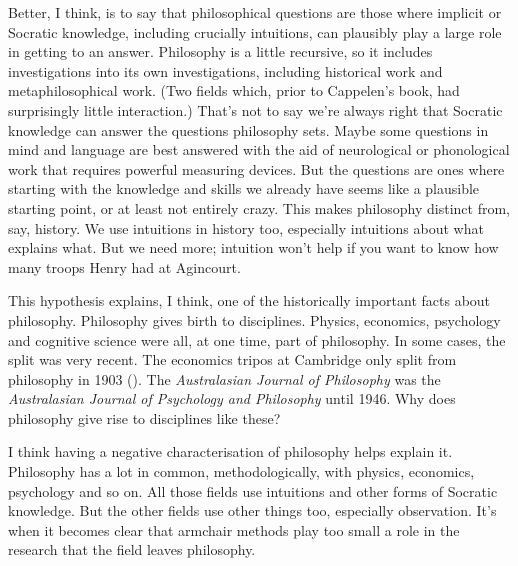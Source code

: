 \documentclass[
  10pt,
  letterpaper,
  DIV=11,
  numbers=noendperiod,
  twoside]{scrartcl}
\begin{document}
Better, I think, is to say that philosophical questions are those where
implicit or Socratic knowledge, including crucially intuitions, can
plausibly play a large role in getting to an answer. Philosophy is a
little recursive, so it includes investigations into its own
investigations, including historical work and metaphilosophical work.
(Two fields which, prior to Cappelen's book, had surprisingly little
interaction.) That's not to say we're always right that Socratic
knowledge can answer the questions philosophy sets. Maybe some questions
in mind and language are best answered with the aid of neurological or
phonological work that requires powerful measuring devices. But the
questions are ones where starting with the knowledge and skills we
already have seems like a plausible starting point, or at least not
entirely crazy. This makes philosophy distinct from, say, history. We
use intuitions in history too, especially intuitions about what explains
what. But we need more; intuition won't help if you want to know how
many troops Henry had at Agincourt.

This hypothesis explains, I think, one of the historically important
facts about philosophy. Philosophy gives birth to disciplines. Physics,
economics, psychology and cognitive science were all, at one time, part
of philosophy. In some cases, the split was very recent. The economics
tripos at Cambridge only split from philosophy in 1903
(). The \emph{Australasian Journal
of Philosophy} was the \emph{Australasian Journal of Psychology and
Philosophy} until 1946. Why does philosophy give rise to disciplines
like these?

I think having a negative characterisation of philosophy helps explain
it. Philosophy has a lot in common, methodologically, with physics,
economics, psychology and so on. All those fields use intuitions and
other forms of Socratic knowledge. But the other fields use other things
too, especially observation. It's when it becomes clear that armchair
methods play too small a role in the research that the field leaves
philosophy.
\end{document}
